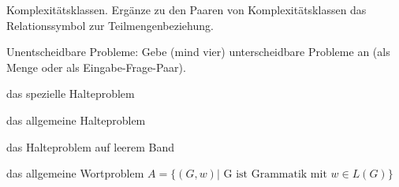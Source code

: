 \documentclass[10pt, a4paper]{exam}
\begin{document}
\begin{questions}

  \question Komplexitätsklassen. Ergänze zu den Paaren von Komplexitätsklassen das Relationssymbol zur Teilmengenbeziehung.

  \question Unentscheidbare Probleme: Gebe (mind vier) unterscheidbare Probleme an (als Menge oder als Eingabe-Frage-Paar).
  \begin{solution}
    
    das spezielle Halteproblem

    das allgemeine Halteproblem

    das Halteproblem auf leerem Band

    das allgemeine Wortproblem $A=\{(G,w) | \text{ G ist Grammatik mit } w\in L(G)\}$


\end{solution}
\end{questions}
\end{document}
